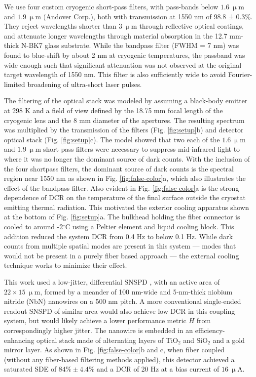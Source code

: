 \documentclass[12pt]{caltech_thesis}
\begin{document}
We use four custom cryogenic short-pass filters, with pass-bands below
\(1.6 \ \mathrm{\upmu m}\) and \(1.9 \ \mathrm{\upmu m}\) (Andover
Corp.), both with transmission at 1550 nm of 98.8 ± 0.3\%. They reject
wavelengths shorter than \(3 \ \mathrm{\upmu m}\) through reflective
optical coatings, and attenuate longer wavelengths through material
absorption in the 12.7 mm-thick N-BK7 glass substrate. While the
bandpass filter (FWHM = 7 nm) was found to blue-shift by about 2 nm at
cryogenic temperatures, the passband was wide enough such that
significant attenuation was not observed at the original target
wavelength of 1550 nm. This filter is also sufficiently wide to avoid
Fourier-limited broadening of ultra-short laser pulses.

The filtering of the optical stack was modeled by assuming a black-body
emitter at 298 K and a field of view defined by the 18.75 mm focal
length of the cryogenic lens and the 8 mm diameter of the apertures. The
resulting spectrum was multiplied by the transmission of the filters
(Fig. \ref{fig:setup}b) and detector optical stack (Fig.
\ref{fig:setup}c). The model showed that two each of the
\(1.6 \ \mathrm{\upmu m}\) and \(1.9 \ \mathrm{\upmu m}\) short pass
filters were necessary to suppress mid-infrared light to where it was no
longer the dominant source of dark counts. With the inclusion of the
four shortpass filters, the dominant source of dark counts is the
spectral region near 1550 nm as shown in Fig. \ref{fig:false-color}a,
which also illustrates the effect of the bandpass filter. Also evident
in Fig. \ref{fig:false-color}a is the strong dependence of DCR on the
temperature of the final surface outside the cryostat emitting thermal
radiation. This motivated the exterior cooling apparatus shown at the
bottom of Fig. \ref{fig:setup}a. The bulkhead holding the fiber
connector is cooled to around -2\(^\circ\)C using a Peltier element and
liquid cooling block. This addition reduced the system DCR from 0.4 Hz
to below 0.1 Hz. While dark counts from multiple spatial modes are
present in this system --- modes that would not be present in a purely
fiber based approach --- the external cooling technique works to
minimize their effect.

This work used a low-jitter, differential SNSPD \cite{Colangelo2021},
with an active area of \(22 \times 15 \ \mathrm{\upmu m}\), formed by a
meander of 100 nm-wide and 5-nm-thick niobium nitride (NbN) nanowires on
a 500 nm pitch. A more conventional single-ended readout SNSPD of
similar area would also achieve low DCR in this coupling system, but
would likely achieve a lower performance metric \(H\) from
correspondingly higher jitter. The nanowire is embedded in an
efficiency-enhancing optical stack made of alternating layers of
TiO\(_2\) and SiO\(_2\) and a gold mirror layer. As shown in Fig.
\ref{fig:false-color}b and c, when fiber coupled (without any
fiber-based filtering methods applied), this detector achieved a
saturated SDE of \(84\% \pm 4.4 \%\) and a DCR of 20 Hz at a bias
current of \(16\ \mathrm{\upmu A}\).
\end{document}
